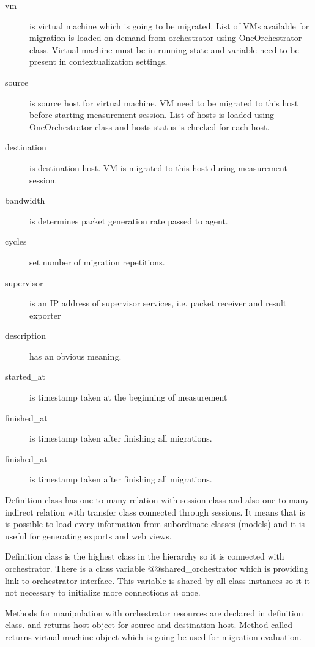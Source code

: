 \begin{description}
	\item[vm] is virtual machine which is going to be migrated. List of \Ac{VM}s available for migration is loaded on-demand from orchestrator using OneOrchestrator class. Virtual machine must be in running state and variable  need to be present in contextualization settings.
	\item[source] is source host for virtual machine. \Ac{VM} need to be migrated to this host before starting measurement session. List of hosts is loaded using OneOrchestrator class and hosts status is checked for each host.
	\item[destination] is destination host. \Ac{VM} is migrated to this host during measurement session.
	\item[bandwidth] is determines packet generation rate passed to agent.
	\item[cycles] set number of migration repetitions.
	\item[supervisor] is an \Ac{IP} address of supervisor services, i.e. packet receiver and result exporter
	\item[description] has an obvious meaning.

	\item[started\_at] is timestamp taken at the beginning of measurement	\item[finished\_at] is timestamp taken after finishing all migrations.
	\item[finished\_at] is timestamp taken after finishing all migrations.
\end{description}

Definition class has one-to-many relation with session class and also one-to-many indirect relation with transfer class connected through sessions. It means that is is possible to load every information from subordinate classes (models) and it is useful for generating exports and web views.

Definition class is the highest class in the hierarchy so it is connected with orchestrator. There is a class variable {@@shared\_orchestrator} which is providing link to orchestrator interface. This variable is shared by all class instances so it it not necessary to initialize more connections at once.

Methods for manipulation with orchestrator resources are declared in definition class.  and  returns host object for source and destination host. Method called  returns virtual machine object which is going be used for migration evaluation.

